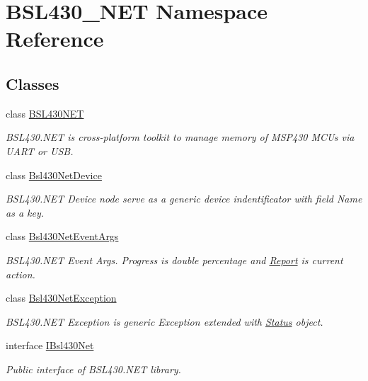 \hypertarget{namespace_b_s_l430___n_e_t}{}\section{B\+S\+L430\+\_\+\+N\+ET Namespace Reference}
\label{namespace_b_s_l430___n_e_t}
\subsection*{Classes}
\begin{DoxyCompactItemize}
\item 
class \mbox{\hyperlink{class_b_s_l430___n_e_t_1_1_b_s_l430_n_e_t}{B\+S\+L430\+N\+ET}}
\begin{DoxyCompactList}\small\item\em B\+S\+L430.\+N\+ET is cross-\/platform toolkit to manage memory of M\+S\+P430 M\+C\+Us via U\+A\+RT or U\+SB. \end{DoxyCompactList}\item 
class \mbox{\hyperlink{class_b_s_l430___n_e_t_1_1_bsl430_net_device}{Bsl430\+Net\+Device}}
\begin{DoxyCompactList}\small\item\em B\+S\+L430.\+N\+ET Device node serve as a generic device indentificator with field \textquotesingle{}Name\textquotesingle{} as a key. \end{DoxyCompactList}\item 
class \mbox{\hyperlink{class_b_s_l430___n_e_t_1_1_bsl430_net_event_args}{Bsl430\+Net\+Event\+Args}}
\begin{DoxyCompactList}\small\item\em B\+S\+L430.\+N\+ET Event Args. Progress is double percentage and \mbox{\hyperlink{class_b_s_l430___n_e_t_1_1_report}{Report}} is current action. \end{DoxyCompactList}\item 
class \mbox{\hyperlink{class_b_s_l430___n_e_t_1_1_bsl430_net_exception}{Bsl430\+Net\+Exception}}
\begin{DoxyCompactList}\small\item\em B\+S\+L430.\+N\+ET Exception is generic Exception extended with \mbox{\hyperlink{class_b_s_l430___n_e_t_1_1_status}{Status}} object. \end{DoxyCompactList}\item 
interface \mbox{\hyperlink{interface_b_s_l430___n_e_t_1_1_i_bsl430_net}{I\+Bsl430\+Net}}
\begin{DoxyCompactList}\small\item\em Public interface of B\+S\+L430.\+N\+ET library. \end{DoxyCompactList}\item 

\end{DoxyCompactItemize}

